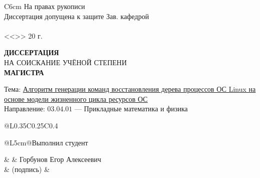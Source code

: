 \begin{titlepage}
\setlength{\headheight}{100pt} %


{
\renewcommand{\arraystretch}{2}

\hfill
\begin{tabular}{C{6cm}}
На правах рукописи \\
Диссертация допущена к защите Зав. кафедрой\\
\myuline{6cm}\\
<<\myuline{0.7cm}>> \myuline{3cm} 20\myuline{0.7cm} г.\\
\end{tabular}
}

\vspace{1cm}

\begin{center}
{ \Large \textbf{ДИССЕРТАЦИЯ}}\\
{ \Large НА СОИСКАНИЕ УЧЁНОЙ СТЕПЕНИ}\\
{ \Large \textbf{МАГИСТРА}}\\
\end{center}

\vspace{1cm}

{
\large
Тема: \uline{Алгоритм генерации команд восстановления дерева процессов ОС Linux на основе модели жизненного цикла ресурсов ОС} \\[0.25cm]
Направление: $03.04.01$ --- Прикладные математика и физика\\

\vspace{0.5cm}

{
	\noindent\begin{tabular}{@{}L{0.35\textwidth}C{0.25\textwidth}C{0.4\textwidth}}
	\begin{tabular}[x]{@{}L{5cm}@{}}Выполнил студент\end{tabular} 
	&  & Горбунов Егор Алексеевич \\[-0.15cm]
	& {\tiny (подпись)} &
	\end{tabular}\\[0.5cm]

}}
\end{titlepage}
